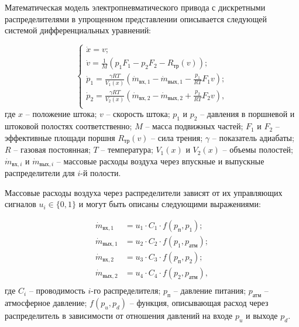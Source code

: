 Математическая модель электропневматического привода с дискретными распределителями в
упрощенном представлении описывается следующей системой дифференциальных уравнений:

\begin{equation}
	\begin{cases}
		\dot{x} = v;                                                                                                  \\
		\dot{v} = \frac{1}{M}(p_1 F_1 - p_2 F_2 - R_{\text{тр}}(v));                                                  \\
		\dot{p}_1 = \frac{\gamma R T}{V_1(x)}(\dot{m}_{\text{вх},1} - \dot{m}_{\text{вых},1} - \frac{p_1}{R T}F_1 v); \\
		\dot{p}_2 = \frac{\gamma R T}{V_2(x)}(\dot{m}_{\text{вх},2} - \dot{m}_{\text{вых},2} + \frac{p_2}{R T}F_2 v), \\
	\end{cases}
\end{equation}
где $x$ -- положение штока;
$v$ -- скорость штока;
$p_1$ и $p_2$ -- давления в поршневой и штоковой полостях соответственно;
$M$ -- масса подвижных частей;
$F_1$ и $F_2$ -- эффективные площади поршня
$R_{\text{тр}}(v)$ -- сила трения;
$\gamma$ -- показатель адиабаты;
$R$ -- газовая постоянная;
$T$ -- температура;
$V_1(x)$ и $V_2(x)$ -- объемы полостей;
$\dot{m}_{\text{вх},i}$ и $\dot{m}_{\text{вых},i}$ -- массовые расходы воздуха
через впускные и выпускные распределители для $i$-й полости.

Массовые расходы воздуха через распределители зависят от
их управляющих сигналов $u_i \in \{0, 1\}$ и могут быть описаны следующими выражениями:

\begin{equation}
	\begin{aligned}
		\dot{m}_{\text{вх},1}  & = u_1 \cdot C_1 \cdot f(p_\text{п}, p_1);    \\
		\dot{m}_{\text{вых},1} & = u_2 \cdot C_2 \cdot f(p_1, p_\text{атм});  \\
		\dot{m}_{\text{вх},2}  & = u_3 \cdot C_3 \cdot f(p_\text{п}, p_2);    \\
		\dot{m}_{\text{вых},2} & = u_4 \cdot C_4 \cdot f(p_2, p_\text{атм}) , \\
	\end{aligned}
\end{equation}
где $C_i$ -- проводимость $i$-го распределителя;
$p_\text{п}$ -- давление питания;
$p_\text{атм}$ -- атмосферное давление;
$f(p_u, p_d)$ -- функция, описывающая расход через распределитель
в зависимости от отношения давлений на входе $p_u$ и выходе $p_d$.

